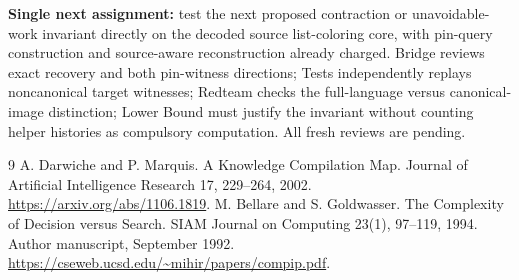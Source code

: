 \documentclass[11pt]{article}
\begin{document}
\textbf{Single next assignment:} test the next proposed contraction or
unavoidable-work invariant directly on the decoded source list-coloring core,
with pin-query construction and source-aware reconstruction already charged.
Bridge reviews exact recovery and both pin-witness directions; Tests independently
replays noncanonical target witnesses; Redteam checks the full-language versus
canonical-image distinction; Lower Bound must justify the invariant without
counting helper histories as compulsory computation. All fresh reviews are pending.

\begin{thebibliography}{9}
 A. Darwiche and P. Marquis. A Knowledge Compilation Map.
Journal of Artificial Intelligence Research 17, 229--264, 2002.
\url{https://arxiv.org/abs/1106.1819}.
 M. Bellare and S. Goldwasser. The Complexity of Decision versus
Search. SIAM Journal on Computing 23(1), 97--119, 1994. Author manuscript,
September 1992. \url{https://cseweb.ucsd.edu/~mihir/papers/compip.pdf}.
\end{thebibliography}
\end{document}
